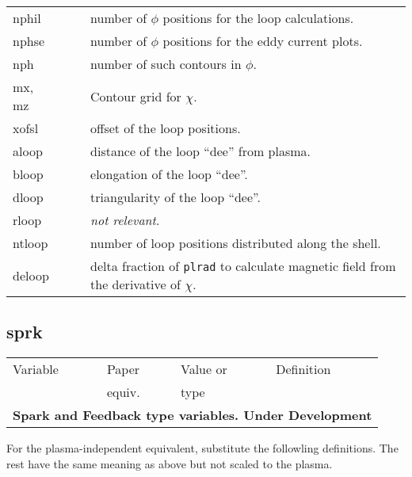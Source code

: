 \documentclass[10pt]{article}
\newcommand{\style}[1]{\texttt{#1}}
\newcommand{\notr}{\textsl{not relevant}}
\begin{document}
\begin{center}
\begin{tabular}{|l|l|p{1.0in}|p{3.8in}|}
nphil & & & number of $\phi$ positions for the loop calculations. \\

nphse & & & number of $\phi$ positions for the eddy current plots. \\

nph & & & number of such contours in $\phi$. \\

mx, mz & & & Contour grid for $\chi$. \\

xofsl & & & offset of the loop positions. \\
aloop  & & & distance of the loop ``dee'' from plasma. \\
bloop  & & & elongation of the loop ``dee''. \\
dloop  & & & triangularity of the loop ``dee''. \\
rloop  & & & \notr .\\
ntloop & & & number of loop positions distributed along the shell. \\
deloop & & & delta fraction of \style{plrad} to calculate
             magnetic field from the derivative of $\chi$.\\

\hline
\end{tabular}
\end{center}


\subsection{sprk}

\begin{center}
\begin{tabular}{|l|l|p{1.0in}|p{3.8in}|}
\hline
Variable & Paper  & Value or &  Definition \\ 
         & equiv. &  type  & \\ \hline

\multicolumn{4}{|c|}{\textbf{Spark and Feedback type variables. Under Development}}\\

\hline
\end{tabular}
\end{center}

For the plasma-independent equivalent, substitute the followling
definitions. The rest have the same meaning as above but not 
scaled to the plasma.\vspace{.1in}
\end{document}
